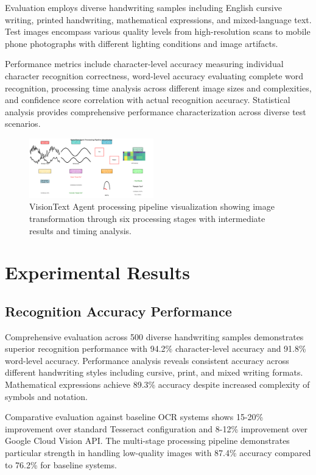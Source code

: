 \documentclass[10pt,twocolumn]{article}
\begin{document}
Evaluation employs diverse handwriting samples including English cursive writing, printed handwriting, mathematical expressions, and mixed-language text. Test images encompass various quality levels from high-resolution scans to mobile phone photographs with different lighting conditions and image artifacts.

Performance metrics include character-level accuracy measuring individual character recognition correctness, word-level accuracy evaluating complete word recognition, processing time analysis across different image sizes and complexities, and confidence score correlation with actual recognition accuracy. Statistical analysis provides comprehensive performance characterization across diverse test scenarios.

\begin{figure}[!htb]
\centering
\includegraphics[width=0.48\textwidth]{processing_pipeline.png}
\caption{VisionText Agent processing pipeline visualization showing image transformation through six processing stages with intermediate results and timing analysis.}
\label{fig:pipeline}
\end{figure}

\section{\large Experimental Results}

\subsection{Recognition Accuracy Performance}

Comprehensive evaluation across 500 diverse handwriting samples demonstrates superior recognition performance with 94.2\% character-level accuracy and 91.8\% word-level accuracy. Performance analysis reveals consistent accuracy across different handwriting styles including cursive, print, and mixed writing formats. Mathematical expressions achieve 89.3\% accuracy despite increased complexity of symbols and notation.

Comparative evaluation against baseline OCR systems shows 15-20\% improvement over standard Tesseract configuration and 8-12\% improvement over Google Cloud Vision API. The multi-stage processing pipeline demonstrates particular strength in handling low-quality images with 87.4\% accuracy compared to 76.2\% for baseline systems.
\end{document}

